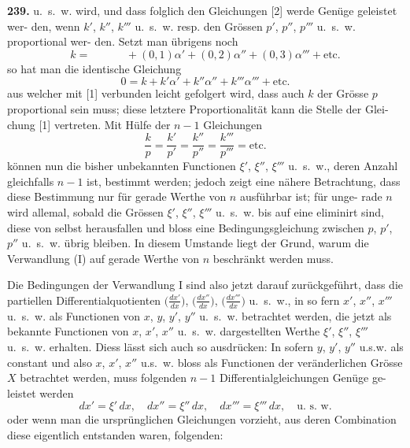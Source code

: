 \documentclass[12pt,a4paper]{article}
\begin{document}
\newpage
\noindent\textbf{239.}\quad
u.~s.~w. wird, und dass folglich den Gleichungen [2] werde Genüge geleistet wer-
den, wenn $k'$, $k''$, $k'''$ u.~s.~w. resp. den Grössen $p'$, $p''$, $p'''$ u.~s.~w. proportional wer-
den. Setzt man übrigens noch
\begin{equation*}
k = \phantom{(0,0)}+(0,1)\alpha'+(0,2)\alpha''+(0,3)\alpha''' + \text{etc.}
\end{equation*}
so hat man die identische Gleichung
\begin{equation*}
0 = k + k'\alpha' + k''\alpha'' + k'''\alpha''' + \text{etc.}
\end{equation*}
aus welcher mit [1] verbunden leicht gefolgert wird, dass auch $k$ der Grösse $p$
proportional sein muss; diese letztere Proportionalität kann die Stelle der Glei-
chung [1] vertreten. Mit Hülfe der $n-1$ Gleichungen
\begin{equation*}
\frac{k}{p} = \frac{k'}{p'} = \frac{k''}{p''} = \frac{k'''}{p'''} = \text{etc.}
\end{equation*}
können nun die bisher unbekannten Functionen $\xi'$, $\xi''$, $\xi'''$ u.~s.~w., deren Anzahl
gleichfalls $n-1$ ist, bestimmt werden; jedoch zeigt eine nähere Betrachtung,
dass diese Bestimmung nur für gerade Werthe von $n$ ausführbar ist; für unge-
rade $n$ wird allemal, sobald die Grössen $\xi'$, $\xi''$, $\xi'''$ u.~s.~w. bis auf eine eliminirt
sind, diese von selbst herausfallen und bloss eine Bedingungsgleichung zwischen
$p$, $p'$, $p''$ u.~s.~w. übrig bleiben. In diesem Umstande liegt der Grund, warum die
Verwandlung (I) auf gerade Werthe von $n$ beschränkt werden muss.

\smallskip\noindent
Die Bedingungen der Verwandlung I sind also jetzt darauf zurückgeführt,
dass die partiellen Differentialquotienten $\bigl(\frac{dx'}{dx}\bigr)$, $\bigl(\frac{dx''}{dx}\bigr)$, $\bigl(\frac{dx'''}{dx}\bigr)$ u.~s.~w., in so fern
$x'$, $x''$, $x'''$ u.~s.~w. als Functionen von $x$, $y$, $y'$, $y''$ u.~s.~w. betrachtet werden, die jetzt
als bekannte Functionen von $x$, $x'$, $x''$ u.~s.~w. dargestellten Werthe $\xi'$, $\xi''$, $\xi'''$ u.~s.~w.
erhalten. Diess lässt sich auch so ausdrücken: In sofern $y$, $y'$, $y''$ u.s.w. als
constant und also $x$, $x'$, $x''$ u.s.~w. bloss als Functionen der veränderlichen Grösse
$X$ betrachtet werden, muss folgenden $n-1$ Differentialgleichungen Genüge ge-
leistet werden
\begin{equation*}
dx' = \xi'\,dx, \quad dx'' = \xi''\,dx, \quad dx''' = \xi'''\,dx, \quad \text{u.~s.~w.}
\end{equation*}
oder wenn man die ursprünglichen Gleichungen vorzieht, aus deren Combination
diese eigentlich entstanden waren, folgenden:
\end{document}
